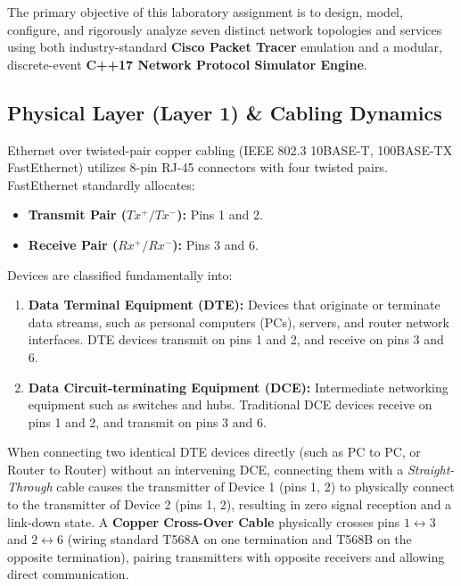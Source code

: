 \documentclass[12pt, a4paper]{article}
\begin{document}
The primary objective of this laboratory assignment is to design, model, configure, and rigorously analyze seven distinct network topologies and services using both industry-standard \textbf{Cisco Packet Tracer} emulation and a modular, discrete-event \textbf{C++17 Network Protocol Simulator Engine}.

\subsection{Physical Layer (Layer 1) \& Cabling Dynamics}
Ethernet over twisted-pair copper cabling (IEEE 802.3 10BASE-T, 100BASE-TX FastEthernet) utilizes 8-pin RJ-45 connectors with four twisted pairs. FastEthernet standardly allocates:
\begin{itemize}
    \item \textbf{Transmit Pair ($Tx^+ / Tx^-$):} Pins 1 and 2.
    \item \textbf{Receive Pair ($Rx^+ / Rx^-$):} Pins 3 and 6.
\end{itemize}
Devices are classified fundamentally into:
\begin{enumerate}
    \item \textbf{Data Terminal Equipment (DTE):} Devices that originate or terminate data streams, such as personal computers (PCs), servers, and router network interfaces. DTE devices transmit on pins 1 and 2, and receive on pins 3 and 6.
    \item \textbf{Data Circuit-terminating Equipment (DCE):} Intermediate networking equipment such as switches and hubs. Traditional DCE devices receive on pins 1 and 2, and transmit on pins 3 and 6.
\end{enumerate}

When connecting two identical DTE devices directly (such as PC to PC, or Router to Router) without an intervening DCE, connecting them with a \textit{Straight-Through} cable causes the transmitter of Device 1 (pins 1, 2) to physically connect to the transmitter of Device 2 (pins 1, 2), resulting in zero signal reception and a link-down state. A \textbf{Copper Cross-Over Cable} physically crosses pins $1 \leftrightarrow 3$ and $2 \leftrightarrow 6$ (wiring standard T568A on one termination and T568B on the opposite termination), pairing transmitters with opposite receivers and allowing direct communication.
\end{document}
